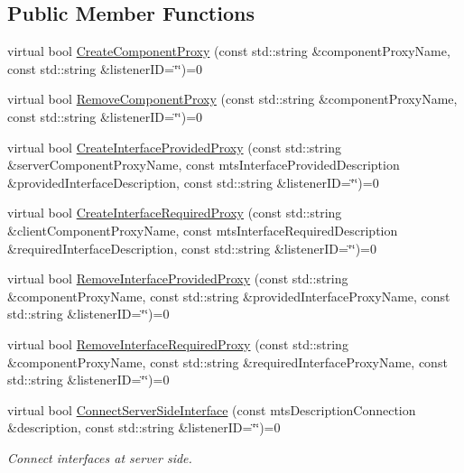 \subsection*{Public Member Functions}
\begin{DoxyCompactItemize}
\item 
virtual bool \hyperlink{classmts_manager_local_interface_abfc11305625c7c4ce4c4bcefbd7efd33}{Create\+Component\+Proxy} (const std\+::string \&component\+Proxy\+Name, const std\+::string \&listener\+I\+D=\char`\"{}\char`\"{})=0
\item 
virtual bool \hyperlink{classmts_manager_local_interface_a652217c6fe0ad3d6a76fcd7fff7c0dc8}{Remove\+Component\+Proxy} (const std\+::string \&component\+Proxy\+Name, const std\+::string \&listener\+I\+D=\char`\"{}\char`\"{})=0
\item 
virtual bool \hyperlink{classmts_manager_local_interface_ad493767a207ec22ed33f6504895f1d94}{Create\+Interface\+Provided\+Proxy} (const std\+::string \&server\+Component\+Proxy\+Name, const mts\+Interface\+Provided\+Description \&provided\+Interface\+Description, const std\+::string \&listener\+I\+D=\char`\"{}\char`\"{})=0
\item 
virtual bool \hyperlink{classmts_manager_local_interface_aee6b1f307a322614857eb18354f946d3}{Create\+Interface\+Required\+Proxy} (const std\+::string \&client\+Component\+Proxy\+Name, const mts\+Interface\+Required\+Description \&required\+Interface\+Description, const std\+::string \&listener\+I\+D=\char`\"{}\char`\"{})=0
\item 
virtual bool \hyperlink{classmts_manager_local_interface_a26a995efe03d1e5061f8eed130dfd368}{Remove\+Interface\+Provided\+Proxy} (const std\+::string \&component\+Proxy\+Name, const std\+::string \&provided\+Interface\+Proxy\+Name, const std\+::string \&listener\+I\+D=\char`\"{}\char`\"{})=0
\item 
virtual bool \hyperlink{classmts_manager_local_interface_a47397143664c81373bd0acb06e937ad6}{Remove\+Interface\+Required\+Proxy} (const std\+::string \&component\+Proxy\+Name, const std\+::string \&required\+Interface\+Proxy\+Name, const std\+::string \&listener\+I\+D=\char`\"{}\char`\"{})=0
\item 
virtual bool \hyperlink{classmts_manager_local_interface_a1c90c76d7ead2cc1fe9a31222d09aa54}{Connect\+Server\+Side\+Interface} (const mts\+Description\+Connection \&description, const std\+::string \&listener\+I\+D=\char`\"{}\char`\"{})=0
\begin{DoxyCompactList}\small\item\em Connect interfaces at server side. \end{DoxyCompactList}\item 

\end{DoxyCompactItemize}
